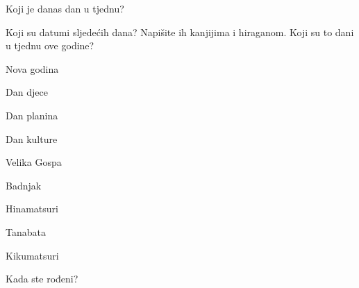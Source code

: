 
\author{Ivan Petranović}

	
	\vspace{15pt}
	\noindent Koji je danas dan u tjednu?
	
	\vspace{15pt}
	\noindent Koji su datumi sljedećih dana? Napišite ih kanjijima i hiraganom. Koji su to dani u tjednu ove godine?
	
	\begin{mondai}{}
		\item Nova godina
		\item Dan djece
		\item Dan planina
		\item Dan kulture
		\item Velika Gospa
		\item Badnjak
		\item Hinamatsuri
		\item Tanabata
		\item Kikumatsuri
	\end{mondai}

	\vspace{15pt}
	\noindent Kada ste rođeni?
